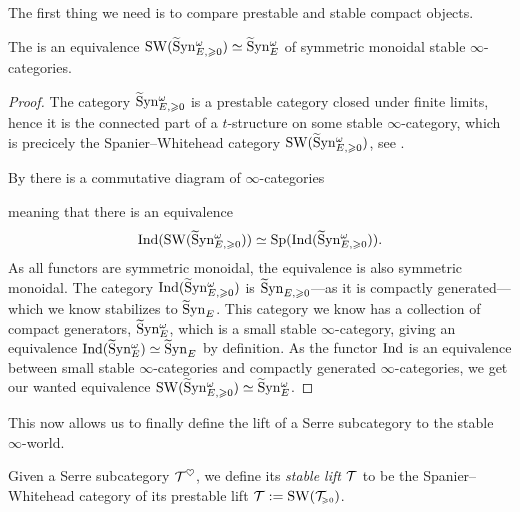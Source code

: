 The first thing we need is to compare prestable and stable compact objects. 

\begin{theorem}
    \label{ch3:add:thm:prestable-freyd-stabilizes-to-stable-Freyd}
    The is an equivalence $\operatorname{SW}(\widetilde{\mathrm{S}}\mathrm{yn}_{E, \geqslant 0}^\omega)\simeq \widetilde{\mathrm{S}}\mathrm{yn}_{E}^\omega$ of symmetric monoidal stable $\infty$-categories.  
\end{theorem}
\begin{proof}
    The category $\widetilde{\mathrm{S}}\mathrm{yn}_{E, \geqslant 0}^\omega$ is a prestable category closed under finite limits, hence it is the connected part of a $t$-structure on some stable $\infty$-category, which is precicely the Spanier--Whitehead category $\operatorname{SW}(\widetilde{\mathrm{S}}\mathrm{yn}_{E, \geqslant 0}^\omega)$, see \cite[C.1.1, C.1.2]{lurie_SAG}. 

    By \cite[C.1.1.6]{lurie_SAG} there is a commutative diagram of $\infty$-categories
    \begin{center}
    \end{center}
    meaning that there is an equivalence
    \[\operatorname{Ind}(\operatorname{SW}(\widetilde{\mathrm{S}}\mathrm{yn}_{E, \geqslant 0}^\omega))\simeq \mathrm{Sp}(\operatorname{Ind}(\widetilde{\mathrm{S}}\mathrm{yn}_{E, \geqslant 0}^\omega)).\]
    As all functors are symmetric monoidal, the equivalence is also symmetric monoidal. The category $\operatorname{Ind}(\widetilde{\mathrm{S}}\mathrm{yn}_{E, \geqslant 0}^\omega)$ is $\widetilde{\mathrm{S}}\mathrm{yn}_{E, \geqslant 0}$---as it is compactly generated---which we know stabilizes to $\widetilde{\mathrm{S}}\mathrm{yn}_{E}$. This category we know has a collection of compact generators, $\widetilde{\mathrm{S}}\mathrm{yn}_{E}^\omega$, which is a small stable $\infty$-category, giving an equivalence $\operatorname{Ind}(\widetilde{\mathrm{S}}\mathrm{yn}_{E}^\omega)\simeq \widetilde{\mathrm{S}}\mathrm{yn}_{E}$ by definition. As the functor $\operatorname{Ind}$ is an equivalence between small stable $\infty$-categories and compactly generated $\infty$-categories, we get our wanted equivalence $\operatorname{SW}(\widetilde{\mathrm{S}}\mathrm{yn}_{E, \geqslant 0}^\omega)\simeq \widetilde{\mathrm{S}}\mathrm{yn}_{E}^\omega$. 
\end{proof}

This now allows us to finally define the lift of a Serre subcategory to the stable $\infty$-world. 

\begin{definition}
    Given a Serre subcategory $\mathcal{T}^\heartsuit$, we define its \emph{stable lift} $\mathcal{T}$ to be the Spanier--Whitehead category of its prestable lift $\mathcal{T}:= \operatorname{SW}(\mathcal{T}_{\hspace{-1pt}\scriptscriptstyle\geqslant 0})$. 
\end{definition}

